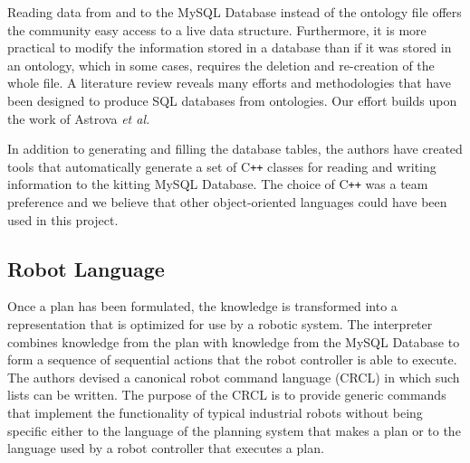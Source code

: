 Reading data from and to the \textsf{MySQL Database} instead of the ontology file offers the community easy access to a live data structure. Furthermore, it is more practical to modify the information stored in a database than if it was stored in an ontology, which in some cases, requires the deletion and re-creation of the whole file. A literature review reveals many efforts and methodologies that have been designed to produce SQL databases from ontologies. Our effort builds upon the work of Astrova \textit{et al.} \cite{Astrova2007}

In addition to generating and filling the database tables, the authors have created tools that automatically generate a set of C{}\texttt{++} classes for reading and writing
information to the kitting \textsf{MySQL Database}. The choice of C{}\texttt{++} was a team preference and we believe that other object-oriented languages could have been used in this project.

\subsection{Robot Language}
\label{subsection:robot_language}
Once a plan has been formulated, the knowledge is transformed into a representation that is optimized for use by a robotic system. The interpreter combines knowledge from the plan with knowledge from the \textsf{MySQL Database} to form a sequence of sequential actions that the robot controller is able to execute. The authors devised a canonical robot command language (CRCL) in which such lists can be written. The purpose of the CRCL is to provide generic commands that implement the functionality of typical industrial robots without being specific either to the language of the planning system that makes a plan or to the language used by a robot controller that executes a plan.